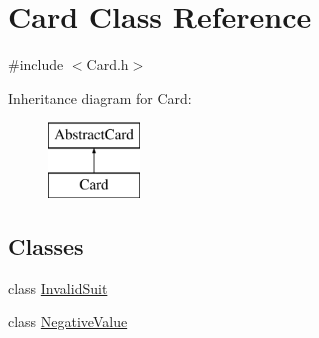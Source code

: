 \hypertarget{class_card}{}\section{Card Class Reference}
\label{class_card}


{\ttfamily \#include $<$Card.\+h$>$}

Inheritance diagram for Card\+:\begin{figure}[H]
\begin{center}
\leavevmode
\includegraphics[height=2.000000cm]{class_card}
\end{center}
\end{figure}
\subsection*{Classes}
\begin{DoxyCompactItemize}
\item 
class \mbox{\hyperlink{class_card_1_1_invalid_suit}{Invalid\+Suit}}
\item 
class \mbox{\hyperlink{class_card_1_1_negative_value}{Negative\+Value}}
\end{DoxyCompactItemize}
